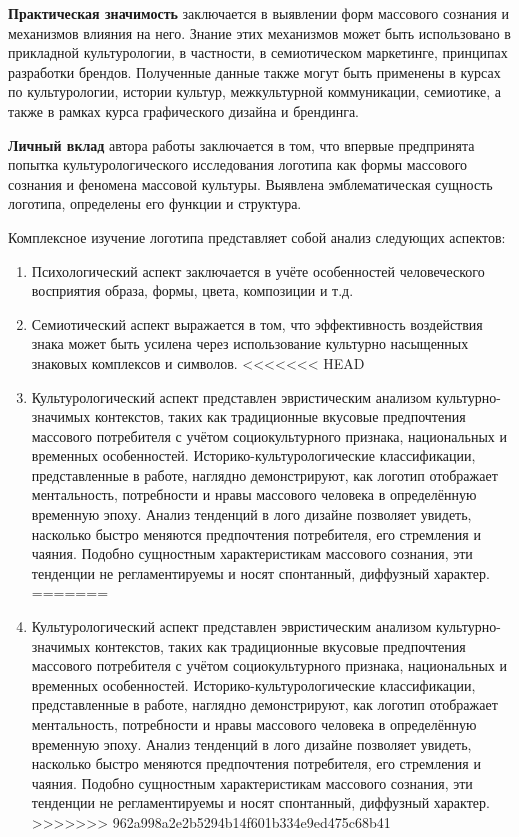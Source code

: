 \textbf{Практическая значимость} заключается в выявлении форм массового сознания и механизмов влияния на него. Знание этих механизмов может быть использовано в прикладной культурологии, в частности, в семиотическом маркетинге, принципах разработки брендов. Полученные данные также могут быть применены в курсах по культурологии, истории культур, межкультурной коммуникации, семиотике, а также в рамках курса графического дизайна и брендинга.

\textbf{Личный вклад} автора работы заключается в том, что впервые предпринята попытка культурологического исследования логотипа как формы массового сознания и феномена массовой культуры. Выявлена эмблематическая сущность логотипа, определены его функции и структура.

Комплексное изучение логотипа представляет собой анализ следующих аспектов:
\begin{enumerate}
\item Психологический аспект заключается в учёте особенностей человеческого восприятия образа, формы, цвета, композиции и т.д.
\item Семиотический аспект выражается в том, что эффективность воздействия знака может быть усилена через использование культурно насыщенных знаковых комплексов и символов.
<<<<<<< HEAD
\item Культурологический аспект представлен эвристическим анализом культурно\hyp{}значимых контекстов, таких как традиционные вкусовые предпочтения массового потребителя с учётом социокультурного признака, национальных и временных особенностей. Историко-культурологические классификации, представленные в работе, наглядно демонстрируют, как логотип отображает ментальность, потребности и нравы массового человека в определённую временную эпоху. Анализ тенденций в лого дизайне позволяет увидеть, насколько быстро меняются предпочтения потребителя, его стремления и чаяния. Подобно сущностным характеристикам массового сознания, эти тенденции не регламентируемы и носят спонтанный, диффузный характер. 
=======
\item Культурологический аспект представлен эвристическим анализом культурно-значимых контекстов, таких как традиционные вкусовые предпочтения массового потребителя с учётом социокультурного признака, национальных и временных особенностей. Историко-культурологические классификации, представленные в работе, наглядно демонстрируют, как логотип отображает ментальность, потребности и нравы массового человека в определённую временную эпоху. Анализ тенденций в лого дизайне позволяет увидеть, насколько быстро меняются предпочтения потребителя, его стремления и чаяния. Подобно сущностным характеристикам массового сознания, эти тенденции не регламентируемы и носят спонтанный, диффузный характер.
>>>>>>> 962a998a2e2b5294b14f601b334e9ed475c68b41
\end{enumerate}

